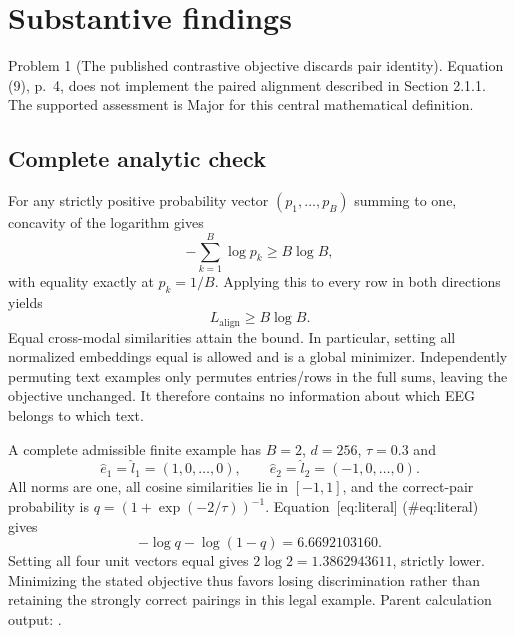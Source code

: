 \documentclass[10pt]{article}
\begin{document}
\section*{Substantive findings}
Problem 1 (The published contrastive objective discards pair identity).  Equation (9), p. 4, does not implement the paired alignment described in Section 2.1.1. The supported assessment is Major for this central mathematical definition.\par
\subsection*{Complete analytic check}
For any strictly positive probability vector \((p_1,\ldots,p_B)\) summing to one, concavity of the logarithm gives \[-\sum_{k=1}^B\log p_k\geq B\log B,\] with equality exactly at \(p_k=1/B\). Applying this to every row in both directions yields \[L_{\mathrm{align}}\geq B\log B.\] Equal cross-modal similarities attain the bound. In particular, setting all normalized embeddings equal is allowed and is a global minimizer. Independently permuting text examples only permutes entries/rows in the full sums, leaving the objective unchanged. It therefore contains no information about which EEG belongs to which text.\par
A complete admissible finite example has \(B=2\), \(d=256\), \(\tau=0.3\) and \[\hat e_1=\hat l_1=(1,0,\ldots,0),\qquad
\hat e_2=\hat l_2=(-1,0,\ldots,0).\] All norms are one, all cosine similarities lie in \([-1,1]\), and the correct-pair probability is \(q=(1+\exp(-2/\tau))^{-1}\). Equation [eq:literal] (\#eq:literal) gives \[-\log q-\log(1-q)=6.6692103160.\] Setting all four unit vectors equal gives \(2\log2=1.3862943611\), strictly lower. Minimizing the stated objective thus favors losing discrimination rather than retaining the strongly correct pairings in this legal example. Parent calculation output: .\par
\end{document}
